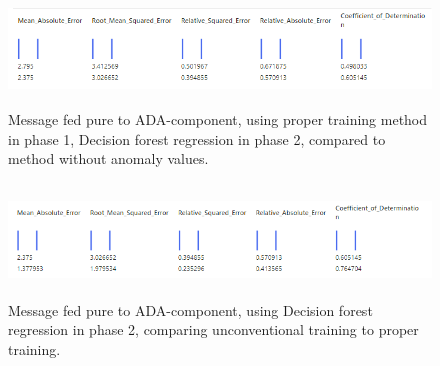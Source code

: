 \begin{figure}[htb]
    \centering
    \includegraphics[height=30mm,scale=0.5]{./appendices/msg_pure_decision-forest-reg_proper2unanom.png}
    \caption{Message fed pure to ADA-component,
        using proper training method in phase 1,
        Decision forest regression in phase 2,
        compared to method without anomaly values.
        \label{fig:msg_pure_decision-forest-reg_proper2unanom}}
\end{figure}



\begin{figure}[htb]
    \centering
    \includegraphics[height=30mm,scale=0.5]{./appendices/msg_pure_decision-forest-reg_lewd2proper.png}
    \caption{Message fed pure to ADA-component,
    using Decision forest regression in phase 2,
        comparing unconventional training to proper training.
        \label{fig:msg_pure_decision-forest-reg_lewd2proper}}
\end{figure}

\clearpage